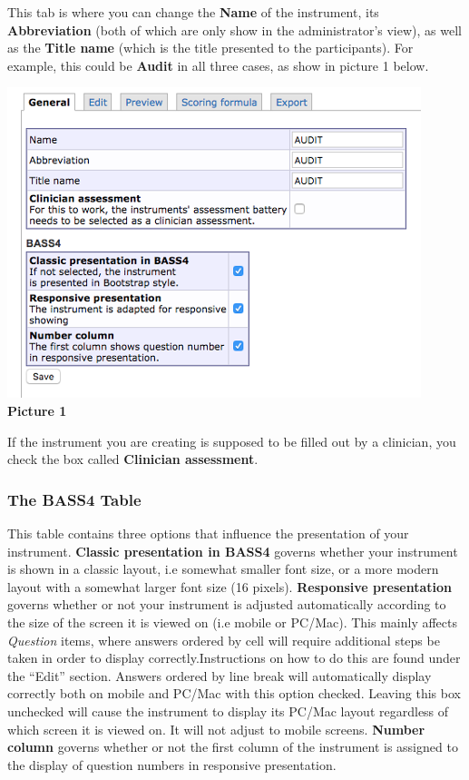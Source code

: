 \documentclass[]{book}
\begin{document}
This tab is where you can change the \textbf{Name} of the instrument, its \textbf{Abbreviation} (both of which are only show in the administrator's view), as well as the \textbf{Title name} (which is the title presented to the participants).
For example, this could be \textbf{Audit} in all three cases, as show in picture 1 below.

\includegraphics{images/new-images/InstrumentsGeneral1.png}
\textbf{Picture 1}

If the instrument you are creating is supposed to be filled out by a clinician, you check the box called \textbf{Clinician assessment}.

\hypertarget{the-bass4-table}{%
\subsubsection{The BASS4 Table}\label{the-bass4-table}}

This table contains three options that influence the presentation of your instrument.
\textbf{Classic presentation in BASS4} governs whether your instrument is shown in a classic layout, i.e somewhat smaller font size, or a more modern layout with a somewhat larger font size (16 pixels).
\textbf{Responsive presentation} governs whether or not your instrument is adjusted automatically according to the size of the screen it is viewed on (i.e mobile or PC/Mac). This mainly affects \emph{Question} items, where answers ordered by cell will require additional steps be taken in order to display correctly.Instructions on how to do this are found under the ``Edit'' section.
Answers ordered by line break will automatically display correctly both on mobile and PC/Mac with this option checked.
Leaving this box unchecked will cause the instrument to display its PC/Mac layout regardless of which screen it is viewed on. It will not adjust to mobile screens.
\textbf{Number column} governs whether or not the first column of the instrument is assigned to the display of question numbers in responsive presentation.
\end{document}
